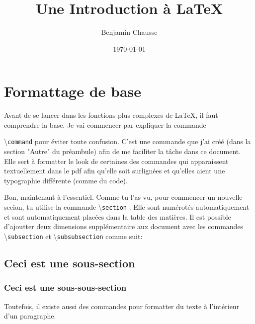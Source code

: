 \documentclass[a4paper, 10pt]{article}
\title{Une Introduction à \LaTeX}
\author{Benjamin Chausse}
\date{\today}
\newcommand{\command}[1]{
  \colorbox{codebackground}{\scriptsize{\textbackslash}\texttt{#1}}
}
\begin{document}
\maketitle


\newpage

\tableofcontents

\newpage

\section{Formattage de base}
Avant de se lancer dans les fonctions plus complexes de \LaTeX, il faut
comprendre la base. Je vai commencer par expliquer la commande
\command{command} pour éviter toute confusion. C'est une commande que j'ai créé
(dans la section "Autre" du préambule) afin de me faciliter la tâche dans ce
document. Elle sert à formatter le look de certaines des commandes qui
apparaissent textuellement dans le pdf afin qu'elle soit surlignées et qu'elles
aient une typographie différente (comme du code).

Bon, maintenant à l'essentiel. Comme tu l'as vu, pour commencer un nouvelle
secion, tu utilise la commande \command{section}. Elle sont numérotés
automatiquement et sont automatiquement placées dans la table des matières.
Il est possible d'ajoutter deux dimensions supplémentaire aux document avec
les commandes \command{subsection} et \command{subsubsection} comme suit:

\subsection{Ceci est une sous-section}
\subsubsection{Ceci est une sous-sous-section}

Toutefois, il existe aussi des commandes pour formatter du texte à l'intérieur
d'un paragraphe.
\end{document}
